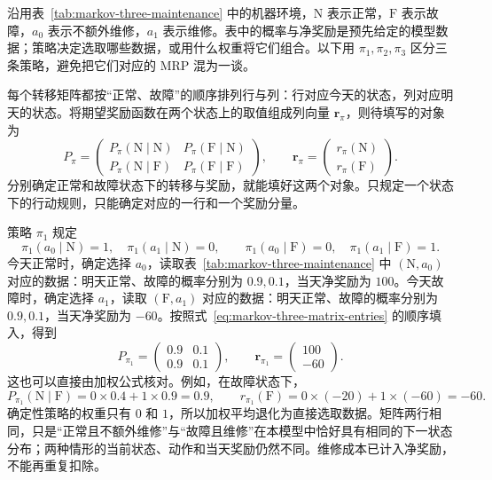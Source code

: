 \documentclass[UTF8,12pt,a4paper,fontset=fandol]{ctexart}
\begin{document}
沿用表~\ref{tab:markov-three-maintenance} 中的机器环境，$\mathrm N$ 表示正常，$\mathrm F$ 表示故障，$a_0$ 表示不额外维修，$a_1$ 表示维修。表中的概率与净奖励是预先给定的模型数据；策略决定选取哪些数据，或用什么权重将它们组合。以下用 $\pi_1,\pi_2,\pi_3$ 区分三条策略，避免把它们对应的 MRP 混为一谈。

每个转移矩阵都按“正常、故障”的顺序排列行与列：行对应今天的状态，列对应明天的状态。将期望奖励函数在两个状态上的取值组成列向量 $\boldsymbol r_\pi$，则待填写的对象为
\begin{equation}
  P_\pi=
  \begin{pmatrix}
    P_\pi(\mathrm N\mid\mathrm N)&P_\pi(\mathrm F\mid\mathrm N)\\
    P_\pi(\mathrm N\mid\mathrm F)&P_\pi(\mathrm F\mid\mathrm F)
  \end{pmatrix},
  \qquad
  \boldsymbol r_\pi=
  \begin{pmatrix}r_\pi(\mathrm N)\\r_\pi(\mathrm F)\end{pmatrix}.
  \label{eq:markov-three-matrix-entries}
\end{equation}
分别确定正常和故障状态下的转移与奖励，就能填好这两个对象。只规定一个状态下的行动规则，只能确定对应的一行和一个奖励分量。

\begin{example}
\label{ex:markov-three-policy-repair}
策略 $\pi_1$ 规定
\[
  \pi_1(a_0\mid\mathrm N)=1,\quad
  \pi_1(a_1\mid\mathrm N)=0,\qquad
  \pi_1(a_0\mid\mathrm F)=0,\quad
  \pi_1(a_1\mid\mathrm F)=1.
\]
今天正常时，确定选择 $a_0$，读取表~\ref{tab:markov-three-maintenance} 中 $(\mathrm N,a_0)$ 对应的数据：明天正常、故障的概率分别为 $0.9,0.1$，当天净奖励为 $100$。今天故障时，确定选择 $a_1$，读取 $(\mathrm F,a_1)$ 对应的数据：明天正常、故障的概率分别为 $0.9,0.1$，当天净奖励为 $-60$。按照式~\eqref{eq:markov-three-matrix-entries} 的顺序填入，得到
\begin{equation}
  P_{\pi_1}=\begin{pmatrix}0.9&0.1\\0.9&0.1\end{pmatrix},
  \qquad
  \boldsymbol r_{\pi_1}=\begin{pmatrix}100\\-60\end{pmatrix}.
  \label{eq:markov-three-policy-repair-mrp}
\end{equation}
这也可以直接由加权公式核对。例如，在故障状态下，
\[
  P_{\pi_1}(\mathrm N\mid\mathrm F)=0\times0.4+1\times0.9=0.9,
  \qquad
  r_{\pi_1}(\mathrm F)=0\times(-20)+1\times(-60)=-60.
\]
确定性策略的权重只有 $0$ 和 $1$，所以加权平均退化为直接选取数据。矩阵两行相同，只是“正常且不额外维修”与“故障且维修”在本模型中恰好具有相同的下一状态分布；两种情形的当前状态、动作和当天奖励仍然不同。维修成本已计入净奖励，不能再重复扣除。
\end{example}
\end{document}
